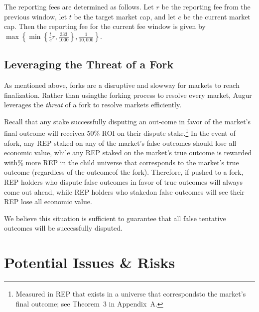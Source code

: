 \documentclass[12pt,floatfix,reprint,nofootinbib,amsmath,amssymb,epsfig,pre,floats,letterpaper,groupedaffiliation]{revtex4-1}
\theoremstyle{definition}
\theoremstyle{definition}
\begin{document}
The reporting fees are determined as follows. Let $r$ be the reporting fee from the previous window, let $t$ be the target market cap, and let $c$ be the current market cap. Then the reporting fee for the current fee window is given by $\max\left\{ \min\left\{\frac{t}{c}r, \frac{333}{1000}\right\} , \frac{1}{10,000}\right\}$.

\subsection{Leveraging the Threat of a Fork}\label{section:leveraging_the_threat_of_a_fork}

As mentioned above, forks are a disruptive and slow\linebreak way for markets to reach finalization. Rather than using\linebreak the forking process to resolve every market, Augur leverages the \textit{threat} of a fork to resolve markets efficiently.

Recall that any stake successfully disputing an out-\linebreak come in favor of the market's final outcome will receive\linebreak a 50\% ROI on their dispute stake.\footnote{Measured in REP that exists in a universe that corresponds\linebreak to the market's final outcome; see Theorem~3 in Appendix~A.} In the event of a\linebreak fork, any REP staked on any of the market's false outcomes should lose all economic value, while any REP staked on the market's true outcome is rewarded with\% more REP in the child universe that corresponds to the market's true outcome (regardless of the outcome\linebreak of the fork). Therefore, if pushed to a fork, REP holders who dispute false outcomes in favor of true outcomes will always come out ahead, while REP holders who staked\linebreak on false outcomes will see their REP lose all economic value.

We believe this situation is sufficient to guarantee that all false tentative outcomes will be successfully disputed.

\section{Potential Issues \& Risks}
\end{document}

